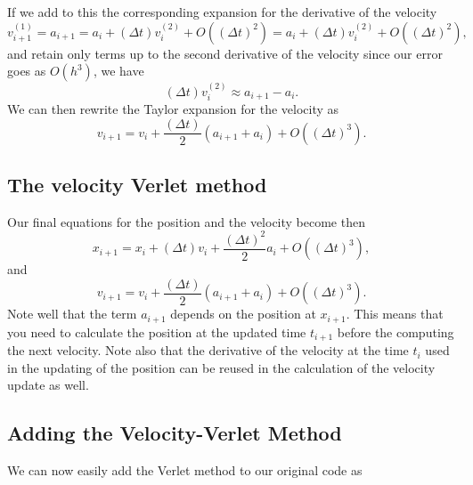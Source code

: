 \documentclass[%
oneside,                 %
final,                   %
10pt]{article}
\begin{document}
If we add to this the corresponding expansion for the derivative of the velocity 
\[
v^{(1)}_{i+1} = a_{i+1}= a_i+(\Delta t)v^{(2)}_i+O((\Delta t)^2)=a_i+(\Delta t)v^{(2)}_i+O((\Delta t)^2), 
\]
and retain only terms up to the second derivative of the velocity since our error goes as $O(h^3)$, we have
\[
(\Delta t)v^{(2)}_i\approx a_{i+1}-a_i.
\]
We can then rewrite the Taylor expansion for the velocity as  
\[
v_{i+1} = v_i+\frac{(\Delta t)}{2}\left( a_{i+1}+a_{i}\right)+O((\Delta t)^3).
\]

\subsection{The velocity Verlet method}

Our final equations for the position and the velocity become then 
\[
x_{i+1} = x_i+(\Delta t)v_i+\frac{(\Delta t)^2}{2}a_{i}+O((\Delta t)^3),
\]
and
\[
v_{i+1} = v_i+\frac{(\Delta t)}{2}\left(a_{i+1}+a_{i}\right)+O((\Delta t)^3). 
\]
Note well that the term $a_{i+1}$ depends on the position at $x_{i+1}$. This means that you need to calculate 
the position at the updated time $t_{i+1}$ before the computing the next velocity.  Note also that the derivative of the velocity at the time
$t_i$ used in the updating of the position can be reused in the calculation of the velocity update as well. 

\subsection{Adding the Velocity-Verlet Method}

We can now easily add the Verlet method to our original code as
\end{document}

